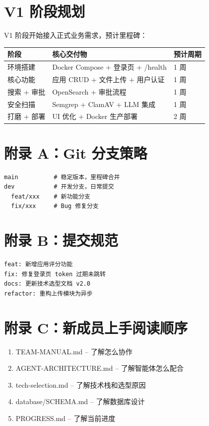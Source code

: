 \documentclass[11pt,a4paper]{article}
\begin{document}
\section{V1 阶段规划}

V1 阶段开始接入正式业务需求，预计里程碑：

\begin{table}[h]
\centering
\begin{tabular}{lll}
\toprule
\textbf{阶段} & \textbf{核心交付物} & \textbf{预计周期} \\
\midrule
环境搭建 & Docker Compose + 登录页 + /health & 1 周 \\
核心功能 & 应用 CRUD + 文件上传 + 用户认证 & 1 周 \\
搜索 + 审批 & OpenSearch + 审批流程 & 1 周 \\
安全扫描 & Semgrep + ClamAV + LLM 集成 & 1 周 \\
打磨 + 部署 & UI 优化 + Docker 生产部署 & 2 周 \\
\bottomrule
\end{tabular}
\end{table}

\appendix
\section{附录 A：Git 分支策略}

\begin{lstlisting}
main          # 稳定版本，里程碑合并
dev           # 开发分支，日常提交
  feat/xxx    # 新功能分支
  fix/xxx     # Bug 修复分支
\end{lstlisting}

\section{附录 B：提交规范}

\begin{lstlisting}
feat: 新增应用评分功能
fix: 修复登录页 token 过期未跳转
docs: 更新技术选型文档 v2.0
refactor: 重构上传模块为异步
\end{lstlisting}

\section{附录 C：新成员上手阅读顺序}

\begin{enumerate}[nosep]
  \item TEAM-MANUAL.md -- 了解怎么协作
  \item AGENT-ARCHITECTURE.md -- 了解智能体怎么配合
  \item tech-selection.md -- 了解技术栈和选型原因
  \item database/SCHEMA.md -- 了解数据库设计
  \item PROGRESS.md -- 了解当前进度
\end{enumerate}
\end{document}
